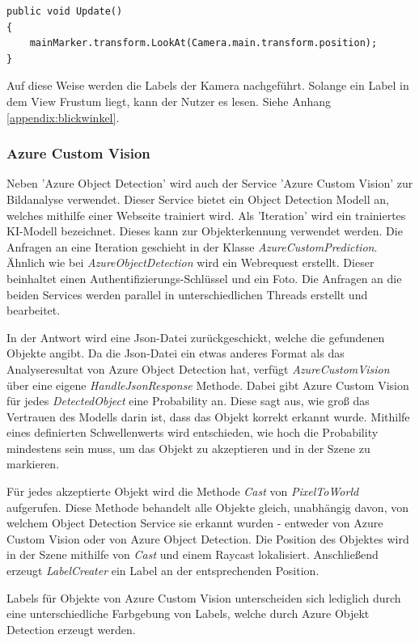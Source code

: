\begin{lstlisting}
public void Update()
{
	mainMarker.transform.LookAt(Camera.main.transform.position);
}
\end{lstlisting}

Auf diese Weise werden die Labels der Kamera nachgeführt. Solange ein Label in dem View Frustum liegt, kann der Nutzer es lesen. Siehe Anhang \ref{appendix:blickwinkel}.

\subsubsection{Azure Custom Vision}

Neben 'Azure Object Detection' wird auch der Service 'Azure Custom Vision' zur Bildanalyse verwendet. Dieser Service bietet ein Object Detection Modell an, welches mithilfe einer Webseite trainiert wird. Als 'Iteration' wird ein trainiertes KI-Modell bezeichnet. Dieses kann zur Objekterkennung verwendet werden. Die Anfragen an eine Iteration geschieht in der Klasse \textit{AzureCustomPrediction}. Ähnlich wie bei \textit{AzureObjectDetection} wird ein Webrequest erstellt. Dieser beinhaltet einen Authentifizierungs-Schlüssel und ein Foto. Die Anfragen an die beiden Services werden parallel in unterschiedlichen Threads erstellt und bearbeitet.

In der Antwort wird eine Json-Datei zurückgeschickt, welche die gefundenen Objekte angibt. Da die Json-Datei ein etwas anderes Format als das Analyseresultat von Azure Object Detection hat, verfügt \textit{AzureCustomVision} über eine eigene \textit{HandleJsonResponse} Methode. Dabei gibt Azure Custom Vision für jedes \textit{DetectedObject} eine Probability an. Diese sagt aus, wie groß das Vertrauen des Modells darin ist, dass das Objekt korrekt erkannt wurde. Mithilfe eines definierten Schwellenwerts wird entschieden, wie hoch die Probability mindestens sein muss, um das Objekt zu akzeptieren und in der Szene zu markieren.

Für jedes akzeptierte Objekt wird die Methode \textit{Cast} von \textit{PixelToWorld} aufgerufen. Diese Methode behandelt alle Objekte gleich,  unabhängig davon, von welchem Object Detection Service sie erkannt wurden - entweder von Azure Custom Vision oder von Azure Object Detection. Die Position des Objektes wird in der Szene mithilfe von \textit{Cast} und einem Raycast lokalisiert. Anschließend erzeugt \textit{LabelCreater} ein Label an der entsprechenden Position. 

Labels für Objekte von Azure Custom Vision unterscheiden sich lediglich durch eine unterschiedliche Farbgebung von Labels, welche durch Azure Objekt Detection erzeugt werden. 

